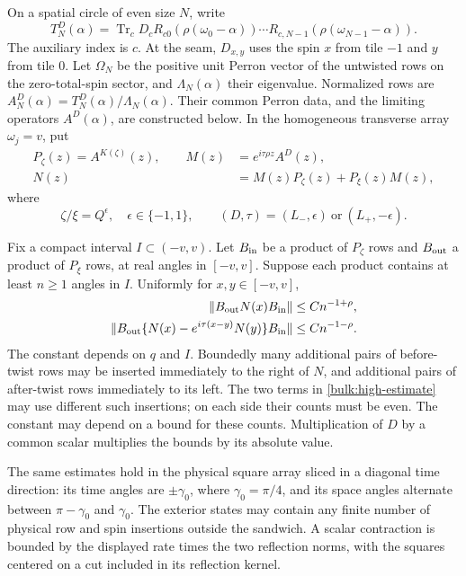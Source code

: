 On a spatial circle of even size $N$, write
\begin{equation}\label{bulk:finite-row}
 T_N^D(\alpha)=\operatorname{Tr}_c
 D_cR_{c0}(\rho(\omega_0-\alpha))\cdots
 R_{c,N-1}(\rho(\omega_{N-1}-\alpha)).
\end{equation}
The auxiliary index is $c$. At the seam, $D_{x,y}$ uses the spin $x$
from tile $-1$ and $y$ from tile $0$. Let $\Omega_N$ be the positive
unit Perron vector of the untwisted rows on the zero-total-spin
sector, and $\Lambda_N(\alpha)$ their eigenvalue. Normalized rows are
$A_N^D(\alpha)=T_N^D(\alpha)/\Lambda_N(\alpha)$.
Their common Perron data, and the limiting operators $A^D(\alpha)$,
are constructed below. In the homogeneous transverse array
$\omega_j=v$, put
\begin{equation}\label{bulk:MN}
 \begin{aligned}
 P_\zeta(z)=A^{K(\zeta)}(z),\qquad
 M(z)&=e^{i\tau\rho z}A^D(z),\\
 N(z)&=M(z)P_\zeta(z)+P_\xi(z)M(z),
 \end{aligned}
\end{equation}
where
\begin{equation}\label{bulk:charges}
 \zeta/\xi=Q^\epsilon,\quad \epsilon\in\{-1,1\},\qquad
 (D,\tau)=(L_-,\epsilon)\ \text{or}\ (L_+,-\epsilon).
\end{equation}

\begin{theorem}\label{bulk:angular-estimate}
Fix a compact interval $I\subset(-v,v)$. Let $B_{\rm in}$ be a
product of $P_\zeta$ rows and $B_{\rm out}$ a product of $P_\xi$ rows,
at real angles in $[-v,v]$. Suppose each product contains at least
$n\ge1$ angles in $I$. Uniformly for $x,y\in[-v,v]$,
\begin{align}
 \|B_{\rm out}N(x)B_{\rm in}\|&\le Cn^{-1+\rho},
 \label{bulk:low-estimate}\\
 \|B_{\rm out}\{N(x)-e^{i\tau(x-y)}N(y)\}B_{\rm in}\|
 &\le Cn^{-1-\rho}.\label{bulk:high-estimate}
\end{align}
The constant depends on $q$ and $I$. Boundedly many additional pairs
of before-twist rows may be inserted immediately to the right of
$N$, and additional pairs of after-twist rows immediately to its
left. The two terms in \eqref{bulk:high-estimate} may use different
such insertions; on each side their counts must be even. The
constant may depend on a bound for these counts. Multiplication of
$D$ by a common scalar multiplies the bounds by its absolute value.

The same estimates hold in the physical square array sliced in a
diagonal time direction: its time angles are $\pm\gamma_0$, where
$\gamma_0=\pi/4$, and its space angles alternate between
$\pi-\gamma_0$ and $\gamma_0$. The exterior states may contain any
finite number of physical row and spin insertions outside the
sandwich. A scalar contraction is bounded by the displayed rate
times the two reflection norms, with the squares centered on a cut
included in its reflection kernel.
\end{theorem}

